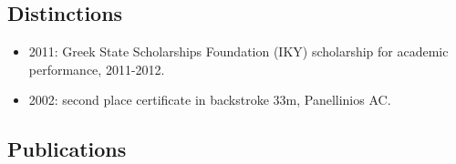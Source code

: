 \documentclass[a4paper,oneside,11pt]{article}
\begin{document}
\subsection*{Distinctions}

\begin{itemize}

\item 2011: Greek State Scholarships Foundation (IKY) scholarship for academic performance, 2011-2012.

\item 2002: second place certificate in backstroke 33m, Panellinios AC.

\end{itemize}

\subsection*{Publications}
\end{document}
